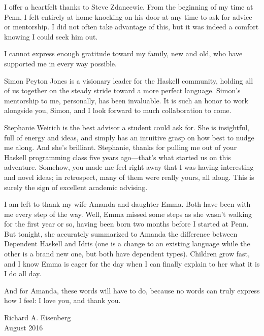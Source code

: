 I offer a heartfelt thanks to Steve Zdancewic. From the beginning of my
time at Penn, I felt entirely at home knocking on his door at any
time to ask for advice or mentorship. I did not often take advantage of this,
but it was indeed a comfort knowing I could seek him out.

I cannot express enough gratitude toward my family, new and old,
who have supported me in
every way possible.

Simon Peyton Jones is a visionary leader for the Haskell community,
holding all of us together on the steady stride toward a more perfect
language. Simon's mentorship to me, personally, has been invaluable.
It is such an honor to work alongside you, Simon, and I look
forward to much collaboration to come.

Stephanie Weirich is the best advisor a student could ask for. She is
insightful, full of energy and ideas, and simply has an intuitive
grasp on how best to nudge me along. And she's brilliant. Stephanie,
thanks for pulling me out of your Haskell programming class five years
ago---that's what started us on this adventure. Somehow, you made me
feel right away that I was having interesting and novel ideas; in
retrospect, many of them were really yours, all along. This is
surely the sign of excellent academic advising.

I am left to thank my wife Amanda and daughter Emma. Both have been
with me every step of the way. Well, Emma missed some steps as she wasn't
walking for the first year or so, having been born two months before
I started at Penn. But tonight, she accurately summarized to Amanda
the difference between Dependent Haskell and Idris (one is a change
to an existing language while the other is a brand new one, but both
have dependent types). Children grow fast, and I know Emma is eager for
the day when I can finally explain to her what it is I do all day.

And for Amanda, these words will have to do, because no words can
truly express how I feel: I love you, and thank you.

\begin{flushright}
Richard A. Eisenberg\\
August 2016
\end{flushright}

